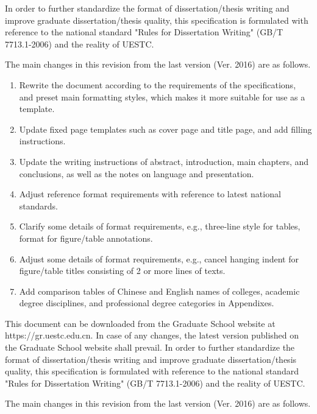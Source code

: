 \begin{abstract*}
  In order to further standardize the format of dissertation/thesis writing and improve graduate dissertation/thesis quality, this specification is formulated with reference to the national standard "Rules for Dissertation Writing" (GB/T 7713.1-2006) and the reality of UESTC.

  The main changes in this revision from the last version (Ver. 2016) are as follows.

  \begin{enumerate}
    \item Rewrite the document according to the requirements of the specifications, and preset main formatting styles, which makes it more suitable for use as a template.
    \item Update fixed page templates such as cover page and title page, and add filling instructions.
    \item Update the writing instructions of abstract, introduction, main chapters, and conclusions, as well as the notes on language and presentation.
    \item Adjust reference format requirements with reference to latest national standards.
    \item Clarify some details of format requirements, e.g., three-line style for tables, format for figure/table annotations.
    \item Adjust some details of format requirements, e.g., cancel hanging indent for figure/table titles consisting of 2 or more lines of texts.
    \item Add comparison tables of Chinese and English names of colleges, academic degree disciplines, and professional degree categories in Appendixes.
  \end{enumerate}

  This document can be downloaded from the Graduate School website at https://gr.uestc.edu.cn. In case of any changes, the latest version published on the Graduate School website shall prevail.
  \newpage
  In order to further standardize the format of dissertation/thesis writing and improve graduate dissertation/thesis quality, this specification is formulated with reference to the national standard "Rules for Dissertation Writing" (GB/T 7713.1-2006) and the reality of UESTC.

  The main changes in this revision from the last version (Ver. 2016) are as follows.


\end{abstract*}
